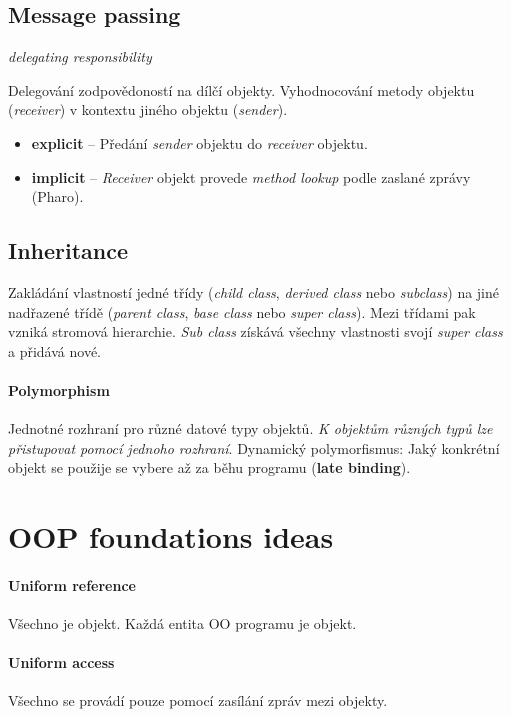 \documentclass{szzclass}
\begin{document}
\subsection{Message passing}

\textit{delegating responsibility}


Delegování zodpovědoností na dílčí objekty.
Vyhodnocování metody objektu (\textit{receiver}) v kontextu jiného objektu (\textit{sender}).

\begin{itemize}
      \item \textbf{explicit} -- Předání \textit{sender} objektu do \textit{receiver} objektu.
      \item \textbf{implicit} -- \textit{Receiver} objekt provede \textit{method lookup} podle zaslané zprávy (Pharo).
\end{itemize}

\subsection{Inheritance}

Zakládání vlastností jedné třídy (\textit{child class}, \textit{derived class} nebo \textit{subclass}) na
jiné nadřazené třídě (\textit{parent class}, \textit{base class} nebo \textit{super class}).
Mezi třídami pak vzniká stromová hierarchie. \textit{Sub class} získává všechny vlastnosti svojí
\textit{super class} a přidává nové.

\paragraph{Polymorphism}
Jednotné rozhraní pro různé datové typy objektů. \textit{K objektům různých typů lze přistupovat pomocí jednoho
rozhraní}.
Dynamický polymorfismus: Jaký konkrétní objekt se použije se vybere až za běhu programu (\textbf{late binding}).


\section{OOP foundations ideas}

\paragraph{Uniform reference}
Všechno je objekt. Každá entita OO programu je objekt.

\paragraph{Uniform access}
Všechno se provádí pouze pomocí zasílání zpráv mezi objekty.
\end{document}
